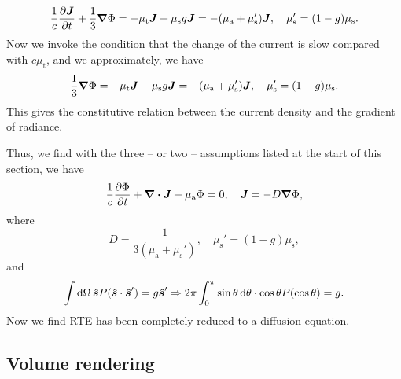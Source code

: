 \documentclass[hyperref, a4paper]{article}
\begin{document}
\begin{equation}
    \frac{1}{c} \pdv{\vb*{J}}{t} + \frac{1}{3} \grad{\Phi}
    = - \mu_{\text{t}} \vb*{J} 
    + \mu_{\text{s}} g \vb*{J}
    = - (\mu_{\text{a}} + \mu_{\text{s}}') \vb*{J}, 
    \quad \mu_{\text{s}}' = (1 - g) \mu_{\text{s}}.
\end{equation}
Now we invoke the condition that the change of the current is slow 
compared with $c \mu_{\text{t}}$, 
and we approximately, we have 
\begin{equation}
    \frac{1}{3} \grad{\Phi}
    = - \mu_{\text{t}} \vb*{J} 
    + \mu_{\text{s}} g \vb*{J}
    = - (\mu_{\text{a}} + \mu_{\text{s}}') \vb*{J}, 
    \quad \mu_{\text{s}}' = (1 - g) \mu_{\text{s}}.
\end{equation}
This gives the constitutive relation between the current density 
and the gradient of radiance. 

Thus, we find with the three -- or two -- assumptions listed at the start of this section, 
we have 
\begin{equation}
    \frac{1}{c} \pdv{\Phi}{t} + \div{\vb*{J}} + \mu_{\text{a}} \Phi = 0, \quad 
    \vb*{J} = - D \grad{\Phi},
    \label{eq:diffusion}
\end{equation}
where 
\begin{equation}
    D = \frac{1}{3 (\mu_{\text{a}} + \mu_{\text{s}}')}, \quad 
    \mu_{\text{s}}' = (1 - g) \mu_{\text{s}}, 
    \label{eq:diffusion-property}
\end{equation}
and 
\begin{equation}
    \int \dd{\Omega} \vu*{s} P(\vu*{s} \cdot \vu*{s}') = g \vu*{s}'
    \Rightarrow 2 \pi \int_{0}^{\pi} \sin \theta \dd{\theta} \cdot \cos \theta P(\cos \theta)
    = g .
\end{equation}
Now we find RTE has been completely reduced to a diffusion equation.

\subsection{Volume rendering}
\end{document}

